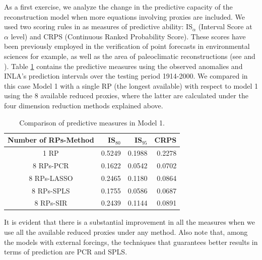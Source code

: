 \documentclass[11pt]{amsart}
\theoremstyle{plain}
\theoremstyle{definition}
\theoremstyle{remark}
\begin{document}
As a first exercise, we analyze the change in the predictive capacity of the
reconstruction model when more equations involving proxies are included. We used
two scoring rules in \cite{Gneiting2007a} as measures of predictive ability:
IS$_\alpha$ (Interval Score at $\alpha$ level) and CRPS (Continuous Ranked
Probability Score). These scores have been previously employed in the
verification of point forecasts in environmental sciences for example, as well as the area
of paleoclimatic reconstructions (see \cite{Barboza2014} and
\cite{Scheuerer2014}). Table \ref{tab:comparison1} contains the predictive
measures using the observed anomalies and INLA's prediction intervals over the
testing period 1914-2000. We compared in this case Model 1 with a single RP
(the longest available) with respect to model 1 using the 8 available reduced
proxies, where the latter are calculated under the four dimension reduction
methods explained above.
\begin{table}
  \centering
  \begin{tabular}{c|rrr}
    \toprule
    Number of RPs-Method& IS$_{80}$ & IS$_{95}$ & CRPS \\ 
    \midrule
    1 RP & 0.5249 & 0.1988 & 0.2278 \\ 
    8 RPs-PCR & 0.1622 & 0.0542 & 0.0702 \\ 
    8 RPs-LASSO & 0.2465 & 0.1180 & 0.0864 \\ 
    8 RPs-SPLS & 0.1755 & 0.0586 & 0.0687 \\ 
    8 RPs-SIR & 0.2439 & 0.1144 & 0.0891 \\ 
    \bottomrule
\end{tabular}
  \caption{Comparison of predictive measures in Model 1.}
  \label{tab:comparison1}
\end{table}
It is evident that there is a substantial improvement
in all the measures when we use all the available reduced proxies under any
method. Also note that, among the models with external forcings, the techniques that
guarantees better results in terms of prediction are PCR and SPLS.
\end{document}
